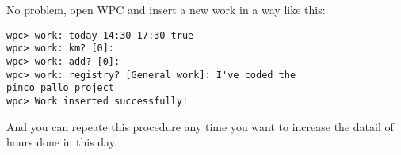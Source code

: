 No problem, open WPC and insert a new work in a way like this:

\begin{lstlisting}
wpc> work: today 14:30 17:30 true
wpc> work: km? [0]: 
wpc> work: add? [0]: 
wpc> work: registry? [General work]: I've coded the
pinco pallo project
wpc> Work inserted successfully!
\end{lstlisting}

And you can repeate this procedure any time you want to increase the datail of hours done in this day.

